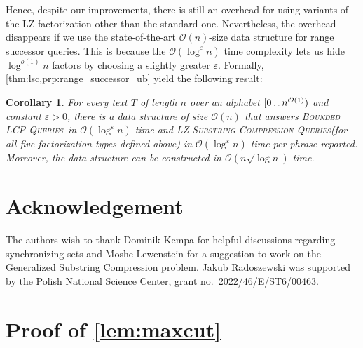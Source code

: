 \documentclass[a4paper]{article}
\newtheorem{corollary}[theorem]{Corollary}
\theoremstyle{definition}
\theoremstyle{remark}
\newcommand{\BLCP}{\textsc{Bounded LCP Queries}\xspace}
\newcommand{\LSC}{\textsc{LZ Substring Compression Queries}\xspace}
\newcommand{\eps}{\varepsilon}
\newcommand{\dd}{\mathinner{\ldotp\ldotp}}
\newcommand{\Oh}{\mathcal{O}}
\begin{document}
Hence, despite our improvements, there is still an overhead for using variants of the LZ factorization other than the standard one.
Nevertheless, the overhead disappears if we use the state-of-the-art $\Oh(n)$-size data structure for range successor queries. This is because the $\Oh(\log^{\eps} n)$ time complexity lets us hide $\log^{o(1)} n$ factors
by choosing a slightly greater $\eps$.
Formally, \cref{thm:lsc,prp:range_successor_ub} yield the following result:
\begin{corollary}\label{cor:app-blcp}
For every text $T$ of length $n$ over an alphabet $[0 \dd n^{\Oh(1)})$ and constant $\eps>0$, there is a data structure of size $\Oh(n)$
that answers \BLCP\ in $\Oh(\log^{\eps }n)$ time
and \LSC (for all five factorization types defined above) in $\Oh(\log^{\eps }n)$ time per phrase reported.
Moreover, the data structure can be constructed in $\Oh(n\sqrt{\log n})$ time.
\end{corollary}


\section*{Acknowledgement}
The authors wish to thank Dominik Kempa for helpful discussions regarding synchronizing sets
and Moshe Lewenstein for a suggestion to work on the Generalized Substring Compression problem.
Jakub Radoszewski was supported by the Polish National Science Center, grant no.\ 2022/46/E/ST6/00463.




\appendix

\section{Proof of \cref{lem:maxcut}}\label{app:AMDC}
\end{document}

